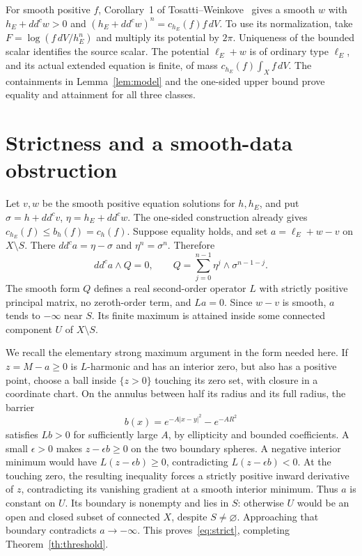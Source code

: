 \documentclass[11pt]{article}
\newcommand{\ddc}{dd^c}
\theoremstyle{remark}\newtheorem{remark}[theorem]{Remark}
\begin{document}
For smooth positive $f$, Corollary~1 of Tosatti--Weinkove~\cite{TW}
gives a smooth $w$ with $h_E+\ddc w>0$ and
$(h_E+\ddc w)^n=c_{h_E}(f)f\,dV$. To use its normalization, take
$F=\log(f\,dV/h_E^n)$ and multiply its potential by $2\pi$.
Uniqueness of the bounded scalar identifies the source scalar.
The potential $\ell_E+w$ is of ordinary type $\ell_E$, and its actual
extended equation is finite, of mass $c_{h_E}(f)\int_Xf\,dV$.
The containments in Lemma~\ref{lem:model} and the one-sided upper bound
prove equality and attainment for all three classes.

\section{Strictness and a smooth-data obstruction}
Let $v,w$ be the smooth positive equation solutions for $h,h_E$, and put
$\sigma=h+\ddc v$, $\eta=h_E+\ddc w$. The one-sided construction
already gives $c_{h_E}(f)\leq b_h(f)=c_h(f)$.
Suppose equality holds, and set
$a=\ell_E+w-v$ on $X\setminus S$. There
$\ddc a=\eta-\sigma$ and $\eta^n=\sigma^n$. Therefore
\[
 \ddc a\wedge Q=0,\qquad
 Q=\sum_{j=0}^{n-1}\eta^j\wedge\sigma^{n-1-j}.
\]
The smooth form $Q$ defines a real second-order operator $L$ with
strictly positive principal matrix, no zeroth-order term, and $La=0$.
Since $w-v$ is smooth, $a$ tends to $-\infty$ near $S$. Its finite
maximum is attained inside some connected component $U$ of
$X\setminus S$.

We recall the elementary strong maximum argument in the form needed
here. If $z=M-a\geq0$ is $L$-harmonic and has an interior zero, but
also has a positive point, choose a ball inside $\{z>0\}$ touching
its zero set, with closure in a coordinate chart. On the annulus
between half its radius and its full radius, the barrier
\[
 b(x)=e^{-A|x-y|^2}-e^{-AR^2}
\]
satisfies $Lb>0$ for sufficiently large $A$, by ellipticity and bounded
coefficients. A small $\epsilon>0$ makes $z-\epsilon b\geq0$ on the
two boundary spheres. A negative interior minimum would have
$L(z-\epsilon b)\geq0$, contradicting $L(z-\epsilon b)<0$.
At the touching zero, the resulting inequality forces a strictly
positive inward derivative of $z$, contradicting its vanishing
gradient at a smooth interior minimum. Thus $a$ is constant on $U$.
Its boundary is nonempty and lies in $S$: otherwise $U$ would be an
open and closed subset of connected $X$, despite $S\ne\varnothing$.
Approaching that boundary contradicts $a\to-\infty$.
This proves~\eqref{eq:strict}, completing Theorem~\ref{th:threshold}.
\end{document}
